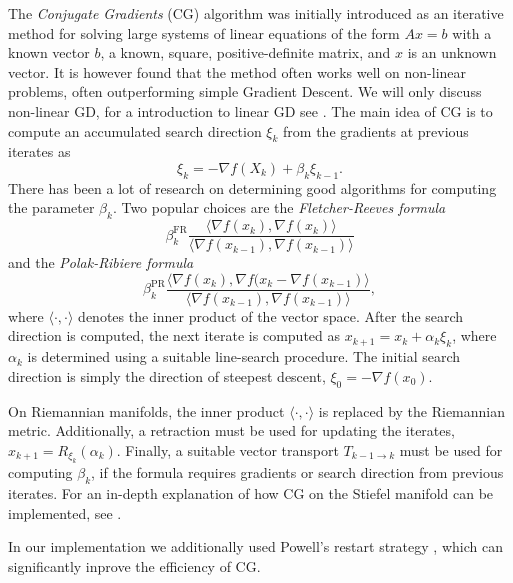 The \textit{Conjugate Gradients} (CG) algorithm \cite{cite:introduction_to_CG_without_pain, cite:a_survey_of_nonlinear_CG_methods, cite:algorithm_CG_DESCENT_a_CG_method_with_guaranteed_descent} was initially introduced as an iterative method for solving large systems of linear equations of the form $Ax = b$ with a known vector $b$, a known, square, positive-definite matrix, and $x$ is an unknown vector. It is however found that the method often works well on non-linear problems, often outperforming simple Gradient Descent. We will only discuss non-linear GD, for a introduction to linear GD see \cite{cite:introduction_to_CG_without_pain}. The main idea of CG is to compute an accumulated search direction $\xi_{k}$ from the gradients at previous iterates as
\begin{equation}
	\xi_k = -\nabla f(X_{k}) + \beta_{k} \xi_{k-1}.
\end{equation}
There has been a lot of research on determining good algorithms for computing the parameter $\beta_{k}$. Two popular choices are the \textit{Fletcher-Reeves formula} \cite{cite:optimization_on_matrix_manifolds}
\begin{equation}
	\beta_{k}^\text{FR}\frac{\langle\nabla f(x_{k}), \nabla f(x_{k})\rangle}{\langle\nabla f(x_{k-1}), \nabla f(x_{k-1})\rangle}
\end{equation}
and the \textit{Polak-Ribiere formula} \cite{cite:optimization_on_matrix_manifolds}
\begin{equation}
	\beta_{k}^\text{PR}\frac{\langle\nabla f(x_{k}), \nabla f(x_{k}-\nabla f(x_{k-1})\rangle}{\langle\nabla f(x_{k-1}), \nabla f(x_{k-1})\rangle},
\end{equation}
where $\langle\cdot,\cdot\rangle$ denotes the inner product of the vector space. After the search direction is computed, the next iterate is computed as $x_{k+1} = x_k + \alpha_k \xi_k$, where $\alpha_k$ is determined using a suitable line-search procedure. The initial search direction is simply the direction of steepest descent, $\xi_0 = -\nabla f(x_0)$. \par
On Riemannian manifolds, the inner product $\langle\cdot,\cdot\rangle$ is replaced by the Riemannian metric. Additionally, a retraction must be used for updating the iterates, $x_{k+1} = R_{\xi_k}(\alpha_k)$. Finally, a suitable vector transport $T_{k-1\rightarrow k}$ must be used for computing $\beta_k$, if the formula requires gradients or search direction from previous iterates. For an in-depth explanation of how CG on the Stiefel manifold can be implemented, see \cite{cite:optimization_on_matrix_manifolds, cite:_a_riemannian_CG_method_for_optimization_on_the_Stifel_manifold, cite:riemannian_optimization_isometric_tensor_networks}. \par
In our implementation we additionally used Powell's restart strategy \cite{cite:on_the_use_of_powells_restart_strategy, cite:a_survey_of_nonlinear_CG_methods, cite:pymanopt}, which can significantly inprove the efficiency of CG.